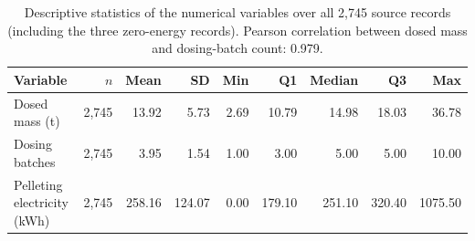 \begin{table}[!htbp]\centering\small
\caption{Descriptive statistics of the numerical variables over all 2,745 source records (including the three zero-energy records). Pearson correlation between dosed mass and dosing-batch count: 0.979.}\label{tab:s_numeric}
\begin{tabular}{@{}lrrrrrrrr@{}}\toprule
Variable & $n$ & Mean & SD & Min & Q1 & Median & Q3 & Max \\\midrule
Dosed mass (t) & 2,745 & 13.92 & 5.73 & 2.69 & 10.79 & 14.98 & 18.03 & 36.78 \\
Dosing batches & 2,745 & 3.95 & 1.54 & 1.00 & 3.00 & 5.00 & 5.00 & 10.00 \\
Pelleting electricity (kWh) & 2,745 & 258.16 & 124.07 & 0.00 & 179.10 & 251.10 & 320.40 & 1075.50 \\
\bottomrule
\end{tabular}
\end{table}

